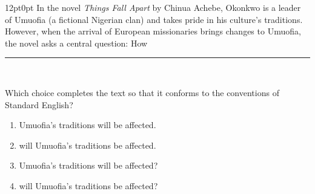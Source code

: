 \documentclass[11pt, twocolumn]{article}
\newcounter{questionnum}
\begin{document}
\vspace{6pt}\noindent
\begin{minipage}{\columnwidth}\raggedright
\noindent{}\par\vspace{8pt}
\begin{adjustwidth}{12pt}{0pt}
In the novel \textit{Things Fall Apart} by Chinua Achebe, Okonkwo is a leader of Umuofia (a fictional Nigerian clan) and takes pride in his culture's traditions. However, when the arrival of European missionaries brings changes to Umuofia, the novel asks a central question: How \,\rule{2cm}{0.4pt}\,
\vspace{6pt}

Which choice completes the text so that it conforms to the conventions of Standard English?
\begin{enumerate}[label=\Alph*),leftmargin=18pt,topsep=3pt,itemsep=2pt]
  \item Umuofia's traditions will be affected.
  \item will Umuofia's traditions be affected.
  \item Umuofia's traditions will be affected?
  \item will Umuofia's traditions be affected?
\end{enumerate}
\end{adjustwidth}
\end{minipage}\par
\end{document}
